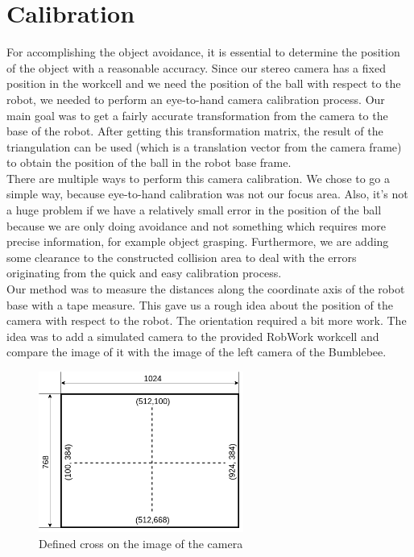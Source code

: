 \section{Calibration}
\label{sec:calib}

For accomplishing the object avoidance, it is essential to determine the position of the object with a reasonable accuracy. Since our stereo camera has a fixed position in the workcell and we need the position of the ball with respect to the robot, we needed to perform an eye-to-hand camera calibration process. Our main goal was to get a fairly accurate transformation from the camera to the base of the robot. After getting this transformation matrix, the result of the triangulation can be used (which is a translation vector from the camera frame) to obtain the position of the ball in the robot base frame.\\

There are multiple ways to perform this camera calibration. We chose to go a simple way, because eye-to-hand calibration was not our focus area. Also, it's not a huge problem if we have a relatively small error in the position of the ball because we are only doing avoidance and not something which requires more precise information, for example object grasping. Furthermore, we are adding some clearance to the constructed collision area to deal with the errors originating from the quick and easy calibration process.\\

Our method was to measure the distances along the coordinate axis of the robot base with a tape measure. This gave us a rough idea about the position of the camera with respect to the robot. The orientation required a bit more work. The idea was to add a simulated camera to the provided RobWork workcell and compare the image of it with the image of the left camera of the Bumblebee.\\

\begin{figure}[ht!]
    \centering
    \includegraphics[width=0.6\textwidth]{Images/definedpoints.png}
    \caption{Defined cross on the image of the camera}
    \label{fig:definedpoints}
\end{figure}

